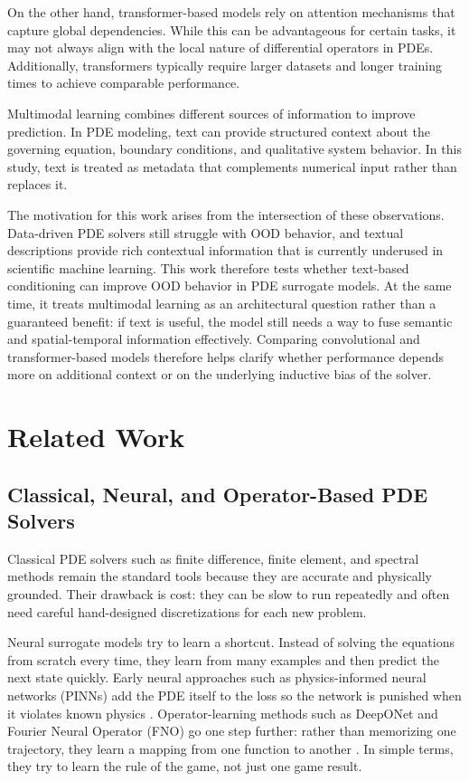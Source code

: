 \documentclass[
]{article}
\begin{document}
On the other hand, transformer-based models rely on attention mechanisms
that capture global dependencies. While this can be advantageous for
certain tasks, it may not always align with the local nature of
differential operators in PDEs. Additionally, transformers typically
require larger datasets and longer training times to achieve comparable
performance.

Multimodal learning combines different sources of information to improve
prediction. In PDE modeling, text can provide structured context about
the governing equation, boundary conditions, and qualitative system
behavior. In this study, text is treated as metadata that complements
numerical input rather than replaces it.

The motivation for this work arises from the intersection of these
observations. Data-driven PDE solvers still struggle with OOD behavior,
and textual descriptions provide rich contextual information that is
currently underused in scientific machine learning. This work therefore
tests whether text-based conditioning can improve OOD behavior in PDE
surrogate models. At the same time, it treats multimodal learning as an
architectural question rather than a guaranteed benefit: if text is
useful, the model still needs a way to fuse semantic and
spatial-temporal information effectively. Comparing convolutional and
transformer-based models therefore helps clarify whether performance
depends more on additional context or on the underlying inductive bias
of the solver.

\section{Related Work}\label{related-work}

\subsection{Classical, Neural, and Operator-Based PDE
Solvers}\label{classical-neural-and-operator-based-pde-solvers}

Classical PDE solvers such as finite difference, finite element, and
spectral methods remain the standard tools because they are accurate and
physically grounded. Their drawback is cost: they can be slow to run
repeatedly and often need careful hand-designed discretizations for each
new problem.

Neural surrogate models try to learn a shortcut. Instead of solving the
equations from scratch every time, they learn from many examples and
then predict the next state quickly. Early neural approaches such as
physics-informed neural networks (PINNs) add the PDE itself to the loss
so the network is punished when it violates known physics
\citep{raissi2019pinns, pinnsagent}. Operator-learning methods such as
DeepONet and Fourier Neural Operator (FNO) go one step further: rather
than memorizing one trajectory, they learn a mapping from one function
to another \citep{deeponet2021, fno2021}. In simple terms, they try to
learn the rule of the game, not just one game result.
\end{document}
